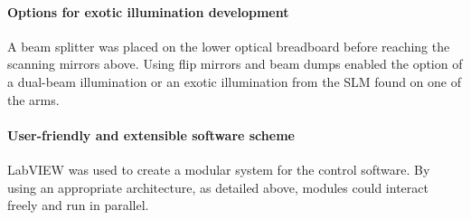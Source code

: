 \paragraph{Options for exotic illumination development}
A beam splitter was placed on the lower optical breadboard before reaching the scanning mirrors above. Using flip mirrors and beam dumps enabled the option of a dual-beam illumination or an exotic illumination from the SLM found on one of the arms.

\paragraph{User-friendly and extensible software scheme}
LabVIEW was used to create a modular system for the control software.
By using an appropriate architecture, as detailed above, modules could interact freely and run in parallel.

